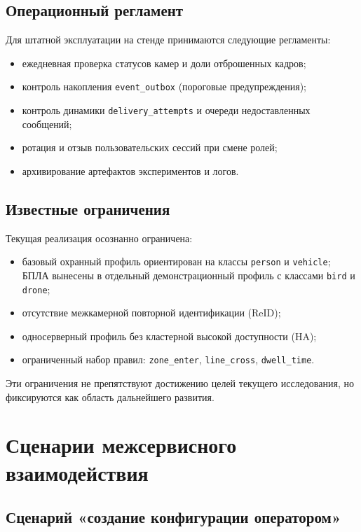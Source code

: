 \subsection{Операционный регламент}

Для штатной эксплуатации на стенде принимаются следующие регламенты:
\begin{itemize}
    \item ежедневная проверка статусов камер и доли отброшенных кадров;
    \item контроль накопления \texttt{event\_outbox} (пороговые предупреждения);
    \item контроль динамики \texttt{delivery\_attempts} и очереди недоставленных сообщений;
    \item ротация и отзыв пользовательских сессий при смене ролей;
    \item архивирование артефактов экспериментов и логов.
\end{itemize}

\subsection{Известные ограничения}

Текущая реализация осознанно ограничена:
\begin{itemize}
    \item базовый охранный профиль ориентирован на классы \texttt{person} и \texttt{vehicle}; БПЛА вынесены в отдельный демонстрационный профиль с классами \texttt{bird} и \texttt{drone};
    \item отсутствие межкамерной повторной идентификации (ReID);
    \item односерверный профиль без кластерной высокой доступности (HA);
    \item ограниченный набор правил: \texttt{zone\_enter}, \texttt{line\_cross}, \texttt{dwell\_time}.
\end{itemize}

Эти ограничения не препятствуют достижению целей текущего исследования, но фиксируются как область дальнейшего развития.

\section{Сценарии межсервисного взаимодействия}

\subsection{Сценарий «создание конфигурации оператором»}

